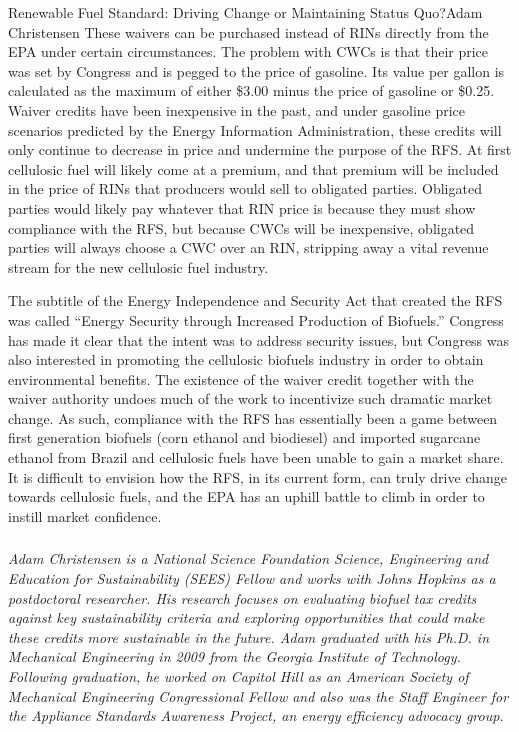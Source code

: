 \documentclass[10pt]{papertex}
\begin{document}
\begin{news}{2}{Renewable Fuel Standard: Driving Change or Maintaining Status 
    Quo?}{Adam Christensen}{}{}
These waivers can be purchased instead of RINs directly from the EPA under 
certain circumstances. The problem with CWCs is that their price was set by 
Congress and is pegged to the price of gasoline. Its value per gallon is 
calculated as the maximum of either \$3.00 minus the price of gasoline or 
\$0.25. Waiver credits have been inexpensive in the past, and under gasoline 
price scenarios predicted by the Energy Information Administration, these 
credits will only continue to decrease in price and undermine the purpose of 
the RFS. At first cellulosic fuel will likely come at a premium, and that 
premium will be included in the price of RINs that producers would sell to 
obligated parties. Obligated parties would likely pay whatever that RIN price 
is because they must show compliance with the RFS, but because CWCs will be 
inexpensive, obligated parties will always choose a CWC over an RIN, stripping 
away a vital revenue stream for the new cellulosic fuel industry.

The subtitle of the Energy Independence and Security Act that created the RFS 
was called “Energy Security through Increased Production of Biofuels.” Congress 
has made it clear that the intent was to address security issues, but Congress 
was also interested in promoting the cellulosic biofuels industry in order to 
obtain environmental benefits. The existence of the waiver credit together 
with the waiver authority undoes much of the work to incentivize such dramatic 
market change. As such, compliance with the RFS has essentially been a game 
between first generation biofuels (corn ethanol and biodiesel) and imported 
sugarcane ethanol from Brazil and cellulosic fuels have been unable to gain a 
market share. It is difficult to envision how the RFS, in its current form, 
can truly drive change towards cellulosic fuels, and the EPA has an uphill 
battle to climb in order to instill market confidence.

\subsubsection*{}

\emph{Adam Christensen is a National Science Foundation Science, Engineering 
and Education for Sustainability (SEES) Fellow and works with Johns Hopkins 
as a postdoctoral researcher. His research focuses on evaluating biofuel tax 
credits against key sustainability criteria and exploring opportunities that 
could make these credits more sustainable in the future. Adam graduated with 
his Ph.D. in Mechanical Engineering in 2009 from the Georgia Institute of 
Technology. Following graduation, he worked on Capitol Hill as an American 
Society of Mechanical Engineering Congressional Fellow and also was the Staff 
Engineer for the Appliance Standards Awareness Project, an energy efficiency 
advocacy group.}

\end{news}
\end{document}
